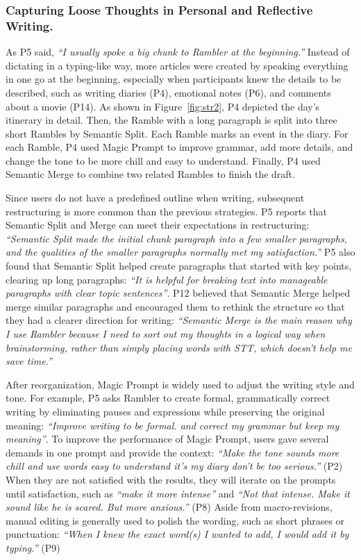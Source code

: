 \subsubsection{Capturing Loose Thoughts in Personal and Reflective Writing.}

As P5 said, \textit{``I usually spoke a big chunk to Rambler at the beginning.''} Instead of dictating in a typing-like way, more articles were created by speaking everything in one go at the beginning, especially when participants knew the details to be described, such as writing diaries (P4), emotional notes (P6), and comments about a movie (P14). As shown in Figure~\ref{fig:str2}, P4 depicted the day's itinerary in detail. Then, the Ramble with a long paragraph is split into three short Rambles by Semantic Split. Each Ramble marks an event in the diary. For each Ramble, P4 used Magic Prompt to improve grammar, add more details, and change the tone to be more chill and easy to understand. Finally, P4 used Semantic Merge to combine two related Rambles to finish the draft.

Since users do not have a predefined outline when writing, subsequent restructuring is more common than the previous strategies. P5 reports that Semantic Split and Merge can meet their expectations in restructuring: \textit{``Semantic Split made the initial chunk paragraph into a few smaller paragraphs, and the qualities of the smaller paragraphs normally met my satisfaction.''} P5 also found that Semantic Split helped create paragraphs that started with key points, clearing up long paragraphs: \textit{``It is helpful for breaking text into manageable paragraphs with clear topic sentences''}. P12 believed that Semantic Merge helped merge similar paragraphs and encouraged them to rethink the structure so that they had a clearer direction for writing: \textit{``Semantic Merge is the main reason why I use Rambler because I need to sort out my thoughts in a logical way when brainstorming, rather than simply placing words with STT, which doesn’t help me save time.''}

After reorganization, Magic Prompt is widely used to adjust the writing style and tone. For example, P5 asks Rambler to create formal, grammatically correct writing by eliminating pauses and expressions while preserving the original meaning: \textit{``Improve writing to be formal. and correct my grammar but keep my meaning''}. To improve the performance of Magic Prompt, users gave several demands in one prompt and provide the context: \textit{``Make the tone sounds more chill and use words easy to understand it’s my diary don’t be too serious.''} (P2) When they are not satisfied with the results, they will iterate on the prompts until satisfaction, such as \textit{``make it more intense''} and \textit{``Not that intense. Make it sound like he is scared. But more anxious.''} (P8) Aside from macro-revisions, manual editing is generally used to polish the wording, such as short phrases or punctuation: \textit{``When I knew the exact word(s) I wanted to add, I would add it by typing.''} (P9)

